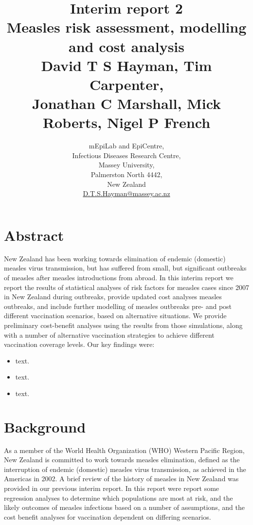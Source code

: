 \documentclass{article}
\begin{document}


\title{Interim report 2\\ Measles risk assessment, modelling and cost analysis\\ \vspace{2 mm} {\large David T S Hayman, Tim Carpenter,\\ Jonathan C Marshall, Mick Roberts, Nigel P French}}
\author{mEpiLab and EpiCentre,\\ Infectious Diseases Research Centre,\\
Massey University,\\
Palmerston North 4442,\\
New Zealand\\
\href{mailto: D.T.S.Hayman@massey.ac.nz}{D.T.S.Hayman@massey.ac.nz}}  %
\maketitle

\section{Abstract}

New Zealand has been working towards elimination of endemic (domestic) measles virus transmission, but has suffered from small, but significant outbreaks of measles after measles introductions from abroad. In this interim report we report the results of statistical analyses of risk factors for measles cases since 2007 in New Zealand during outbreaks, provide updated cost analyses measles outbreaks, and include further modelling of measles outbreaks pre- and post different vaccination scenarios, based on alternative situations. We provide preliminary cost-benefit analyses using the results from those simulations, along with a number of alternative vaccination strategies to achieve different vaccination coverage levels. Our key findings were:
\begin{itemize}
\item text.
\item text.
\item text.
\end{itemize}

\section{Background}

As a member of the World Health Organization (WHO) Western Pacific Region, New Zealand is committed to work towards measles elimination, defined as the interruption of endemic (domestic) measles virus transmission, as achieved in the Americas in 2002. A brief review of the history of measles in New Zealand was provided in our previous interim report. In this report were report some regression analyses to determine which populations are most at risk, and the likely outcomes of measles infections based on a number of assumptions, and the cost benefit analyses for vaccination dependent on differing scenarios. 
\end{document}
